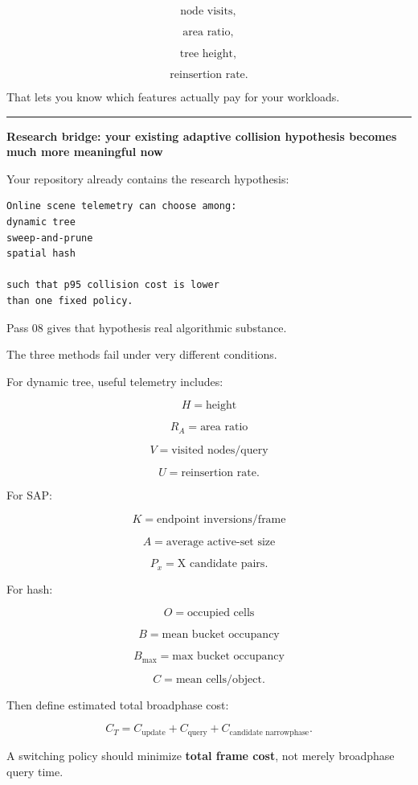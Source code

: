 \[
\text{node visits},
\]

\[
\text{area ratio},
\]

\[
\text{tree height},
\]

\[
\text{reinsertion rate}.
\]

That lets you know which features actually pay for your workloads.

\begin{center}\rule{0.5\linewidth}{0.5pt}\end{center}

\textbf{Research bridge: your existing adaptive collision hypothesis becomes much more meaningful now}

Your repository already contains the research hypothesis:

\begin{verbatim}
Online scene telemetry can choose among:
dynamic tree
sweep-and-prune
spatial hash

such that p95 collision cost is lower
than one fixed policy.
\end{verbatim}

Pass 08 gives that hypothesis real algorithmic substance.

The three methods fail under very different conditions.

For dynamic tree, useful telemetry includes:

\[
H=\text{height}
\]

\[
R_A=\text{area ratio}
\]

\[
V=\text{visited nodes/query}
\]

\[
U=\text{reinsertion rate}.
\]

For SAP:

\[
K=\text{endpoint inversions/frame}
\]

\[
A=\text{average active-set size}
\]

\[
P_x=\text{X candidate pairs}.
\]

For hash:

\[
O=\text{occupied cells}
\]

\[
B=\text{mean bucket occupancy}
\]

\[
B_{\max}=\text{max bucket occupancy}
\]

\[
C=\text{mean cells/object}.
\]

Then define estimated total broadphase cost:

\[
C_T
=
C_{\text{update}}
+
C_{\text{query}}
+
C_{\text{candidate narrowphase}}.
\]

A switching policy should minimize \textbf{total frame cost}, not merely broadphase query time.

